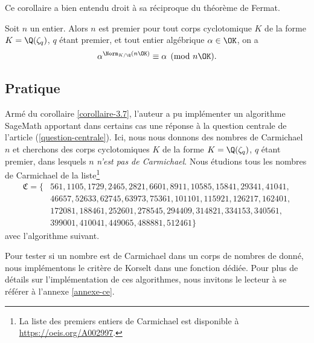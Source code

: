 Ce corollaire a bien entendu droit à sa réciproque du théorème de Fermat.

\begin{theoreme}
	Soit $n$ un entier. Alors $n$ est premier \ssi pour tout corps cyclotomique $K$ de la forme $K = \Q(\zeta_q)$, $q$ étant premier, et tout entier algébrique $\alpha\in \OK$, on a $$\alpha^{\Norm_{K/\Q}(n\OK)} \equiv \alpha \pmod{n\OK}.$$
\end{theoreme}

\subsection{Pratique}

Armé du corollaire \ref{corollaire-3.7}, l'auteur a pu implémenter un algorithme SageMath apportant dans certains cas une réponse à la question centrale de l'article (\ref{question-centrale}). Ici, nous nous donnons des nombres de Carmichael $n$ et cherchons des corps cyclotomiques $K$ de la forme $K = \Q(\zeta_q)$, $q$ étant premier, dans lesquels $n$ \emph{n'est pas de Carmichael}. Nous étudions tous les nombres de Carmichael de la liste\footnote{La liste des premiers entiers de Carmichael est disponible à \url{https://oeis.org/A002997}.} 
\begin{align*}
	\mathfrak{C} = \{& 561, 1105, 1729, 2465, 2821, 6601, 8911, 10585, 15841, 29341, 41041,\\ 
	& 46657, 52633, 62745, 63973, 75361, 101101, 115921, 126217, 162401, \\ 
	& 172081, 188461, 252601, 278545, 294409, 314821, 334153, 340561, \\
	& 399001, 410041, 449065, 488881, 512461\}
\end{align*}
avec l'algorithme suivant.

\vspace{1em}
\begin{algorithm}[H]
\end{algorithm}
\vspace{1em}

\begin{remarque}
	Pour tester si un nombre est de Carmichael dans un corps de nombres de donné, nous implémentons le critère de Korselt dans une fonction dédiée. Pour plus de détails sur l'implémentation de ces algorithmes, nous invitons le lecteur à se référer à l'annexe \ref{annexe-ce}.
\end{remarque}


